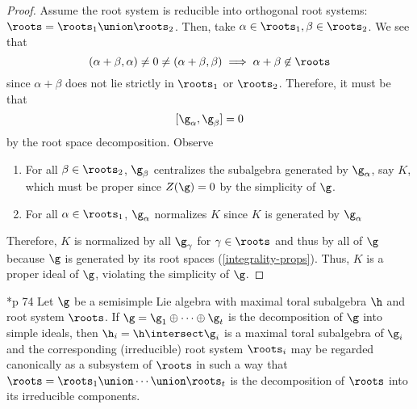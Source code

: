 \documentclass[11pt,leqno,oneside]{amsart}
\numberwithin{thm}{section}
\begin{document}
\begin{proof}
  Assume the root system is reducible into orthogonal root systems:
  \(\roots = \roots_1 \union \roots_2\). Then, take \(\alpha \in
  \roots_1, \beta \in \roots_2\). We see that \[
    (\alpha+\beta,\alpha) \neq 0 \neq (\alpha+\beta,\beta) \implies
    \alpha+\beta \not \in \roots 
  \]
  since \(\alpha+\beta\) does not lie strictly in \(\roots_1\) or
  \(\roots_2\). Therefore, it must be that \[
    [\g_\alpha, \g_\beta] = 0
  \] by the root space decomposition. Observe
  \begin{enumerate}
  \item For all \(\beta \in \roots_2\), \(\g_\beta\) centralizes the
    subalgebra generated by 
    \(\g_\alpha\), say \(K\),
  which must be proper since \(Z(\g) = 0\) by the simplicity of
  \(\g\).
  \item For all \(\alpha \in \roots_1\), \(\g_\alpha\) normalizes
    \(K\) since \(K\) is generated by \(\g_\alpha\) 
  \end{enumerate}
  Therefore, \(K\) is normalized by all \(\g_\gamma\) for \(\gamma \in
  \roots\) and thus by all of \(\g\) because \(\g\) is generated by
  its root spaces (\ref{integrality-props}). Thus, \(K\) is a proper
  ideal of \(\g\), violating the simplicity of \(\g\).
\end{proof}
\begin{cor}
  \cite{humph}*{p 74} Let \(\g\) be a semisimple Lie algebra with
  maximal toral subalgebra 
  \(\h\) and root system \(\roots\). If \(\g = \g_1 \oplus \cdots
  \oplus \g_t\) is the decomposition of \(\g\) into simple ideals,
  then \(\h_i = \h \intersect \g_i\) is a maximal toral subalgebra of
  \(\g_i\) and the corresponding (irreducible) root system
  \(\roots_i\) may be regarded canonically as a subsystem of
  \(\roots\) in such a way that \(\roots = \roots_1 \union \cdots
  \union \roots_t\) is the decomposition of \(\roots\) into its
  irreducible components.
\end{cor}
\end{document}
